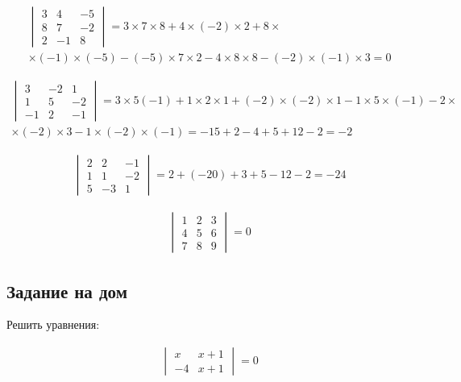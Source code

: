 \documentclass[a4paper, 11pt, oneside]{article}
\begin{document}


\begin{gather*}
	\begin{vmatrix}
		3& 4& -5\\
		8& 7& -2\\
		2& -1& 8
	\end{vmatrix}
	=3\times 7\times 8+4\times (-2)\times 2+8
	\times\\\times
	(-1)\times (-5)-(-5)\times 7\times 2-4\times 8\times 8-(-2)\times (-1)\times 3=0
\end{gather*}


\begin{gather*}
	\begin{vmatrix}
		3& -2& 1\\
		1& 5& -2\\
		-1& 2& -1
	\end{vmatrix}
	=3\times5(-1)+1\times2\times1+(-2)\times(-2)\times1-1\times5\times(-1)-2
	\times\\\times
	(-2)\times3-1\times(-2)\times(-1)=-15+2-4+5+12-2=-2
\end{gather*}

\begin{gather*}
	\begin{vmatrix}
		2& 2& -1\\
		1& 1& -2\\
		5& -3& 1
	\end{vmatrix}
	=2+(-20)+3+5-12-2=-24
\end{gather*}

\begin{gather*} %
	\begin{vmatrix}
		1& 2& 3\\
		4& 5& 6\\
		7& 8& 9
	\end{vmatrix}
	=0
\end{gather*}


\subsection{Задание на дом}
Решить уравнения:

\begin{gather*}
	\begin{vmatrix}
		x& x+1\\
		-4& x+1
	\end{vmatrix}
	=0
\end{gather*}
\end{document}
